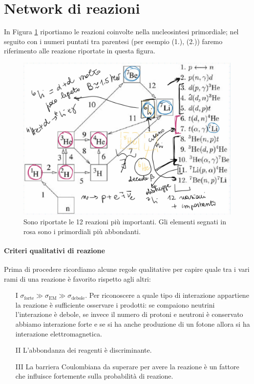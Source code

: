 \section{Network di reazioni}
In Figura \ref{0315_net} riportiamo le reazioni coinvolte nella nucleosintesi primordiale; nel seguito con i numeri puntati tra parentesi (per esempio (1.), (2.)) faremo riferimento alle reazione riportate in questa figura.
\begin{figure}[h]
    \centering
    \includegraphics[scale=0.25]{Immagini/0315_network.png}
    \caption{Sono riportate le 12 reazioni più importanti. Gli elementi segnati in rosa sono i primordiali più abbondanti.}
    \label{0315_net}
\end{figure}

\paragraph{Criteri qualitativi di reazione} Prima di procedere ricordiamo alcune regole qualitative per capire quale tra i vari rami di una reazione è favorito rispetto agli altri:
\begin{itemize}
    \item[I] $\sigma_\text{forte}\gg\sigma_\text{EM}\gg\sigma_\text{debole}$. Per riconoscere a quale tipo di interazione appartiene la reazione è sufficiente osservare i prodotti: se compaiono neutrini l'interazione è debole, se invece il numero di protoni e neutroni è conservato abbiamo interazione forte e se si ha anche produzione di un fotone allora si ha interazione elettromagnetica.
    \item[II] L'abbondanza dei reagenti è discriminante.
    \item[III] La barriera Coulombiana da superare per avere la reazione è un fattore che influisce fortemente sulla probabilità di reazione.
\end{itemize}

